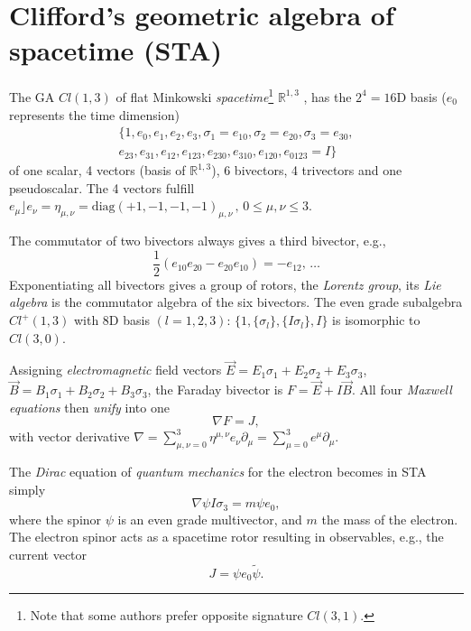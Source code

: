 \documentclass[cameraready]{jcmsi}%
\newcommand{\R}{\mathbb{R}}
\newcommand{\be}{\begin{equation}}
\newcommand{\ee}{\end{equation}}
\begin{document}



\section{Clifford's geometric algebra of spacetime (STA)}

The GA $Cl(1,3)$ of flat Minkowski \textit{spacetime}\footnote{Note that some authors prefer opposite signature $Cl(3,1).$} $\R^{1,3}$ \cite{DL:GAfPh}, has the $2^4=16$D basis ($e_0$ represents the time dimension)
\begin{gather}
   \{1, e_0, e_1, e_2, e_3, 
   \sigma_1=e_{10}, \sigma_2=e_{20}, \sigma_3=e_{30}, 
   \nonumber \\
   e_{23}, e_{31}, e_{12},
   e_{123}, e_{230}, e_{310}, e_{120},
   e_{0123}=I
   \}
\end{gather}
of one scalar, 4 vectors (basis of $\R^{1,3}$), 6 bivectors, 4 trivectors and one pseudoscalar. The 4 vectors fulfill 
  $e_{\mu} \rfloor e_{\nu} = \eta_{\mu,\nu}=\mathrm{diag}(+1,-1,-1,-1)_{\mu,\nu}\,,\, 0\leq \mu,\nu \leq 3$.

The commutator of two bivectors always gives a third bivector, e.g., 
\be 
  \frac{1}{2}(e_{10}e_{20}-e_{20}e_{10}) = -e_{12}, \,\ldots
\ee 
Exponentiating all bivectors gives a group of rotors, the \textit{Lorentz group}, its \textit{Lie algebra} is the commutator algebra of the six bivectors. The even grade subalgebra $Cl^+(1,3)$ with 8D basis $(l=1,2,3)$: $\{1, \{\sigma_l\}, \{I\sigma_l\}, I\}$ is isomorphic to $Cl(3,0)$. 

Assigning \textit{electromagnetic} field vectors $\vec{E}=E_1\sigma_1+E_2\sigma_2+E_3\sigma_3$,  $\vec{B}=B_1\sigma_1+B_2\sigma_2+B_3\sigma_3$, the Faraday bivector is $F=\vec{E}+I\vec{B}$. All four \textit{Maxwell equations} then \textit{unify} into one
\be 
  \nabla F = J,
\ee 
with vector derivative $\nabla = \sum_{\mu,\nu=0}^3\eta^{\mu,\nu} e_{\nu}\partial_{\mu}=\sum_{\mu=0}^3e^{\mu}\partial_{\mu}$. 

The \textit{Dirac} equation of \textit{quantum mechanics} for the electron becomes in STA simply
\be 
  \nabla \psi I \sigma_3 = m \psi e_0,
\ee  
where the spinor $\psi$ is an even grade multivector, and $m$ the mass of the electron. The electron spinor acts as a spacetime rotor resulting in observables, e.g., the current vector
\be 
  J = \psi e_0 \widetilde{\psi}.
\ee 
\end{document}
